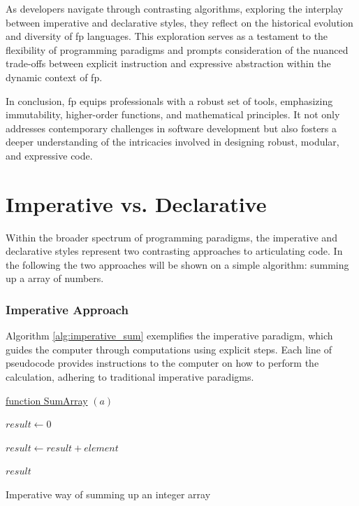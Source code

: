     As developers navigate through contrasting algorithms, exploring the interplay between imperative and declarative styles, they reflect on the historical evolution and diversity of \ac{fp} languages. This exploration serves as a testament to the flexibility of programming paradigms and prompts consideration of the nuanced trade-offs between explicit instruction and expressive abstraction within the dynamic context of \ac{fp}.
    
    In conclusion, \ac{fp} equips professionals with a robust set of tools, emphasizing immutability, higher-order functions, and mathematical principles. It not only addresses contemporary challenges in software development but also fosters a deeper understanding of the intricacies involved in designing robust, modular, and expressive code.
    

\section*{Imperative vs. Declarative}

Within the broader spectrum of programming paradigms, the imperative and declarative styles represent two contrasting approaches to articulating code. In the following the two approaches will be shown on a simple algorithm: summing up a array of numbers.

\subsubsection{Imperative Approach}

Algorithm \ref{alg:imperative_sum} exemplifies the imperative paradigm, which guides the computer through computations using explicit steps. Each line of pseudocode provides instructions to the computer on how to perform the calculation, adhering to traditional imperative paradigms.

\begin{algorithm}

    \underline{function SumArray} $(a)$\;
    
    \BlankLine
    $result \leftarrow 0$
    
    {
        $result \leftarrow result + element$
    }
    
    \Return $result$
    
    \caption{Imperative way of summing up an integer array}
    \label{alg:imperative_sum}
\end{algorithm}

